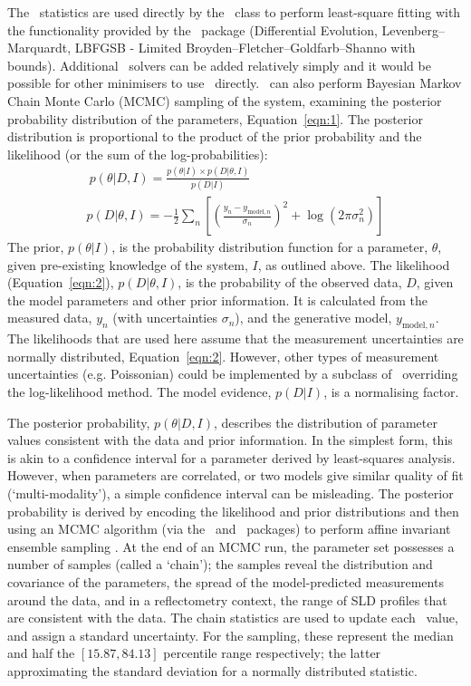 \documentclass[pdf,preprint]{iucr}
\begin{document}
The \Objective\ statistics are used directly by the \CurveFitter\ class to perform least-square fitting with the functionality provided by the \SciPy\ package (Differential  Evolution, Levenberg--Marquardt, LBFGSB - Limited Broyden--Fletcher--Goldfarb--Shanno with bounds). Additional \SciPy\ solvers can be added relatively simply and it would be possible for other minimisers to use \Objective\ directly.
\CurveFitter\ can also perform Bayesian Markov Chain Monte Carlo (MCMC) sampling of the system, examining the posterior probability distribution of the parameters, Equation~\ref{eqn:1}. The posterior distribution is proportional to the product of the prior probability and the likelihood (or the sum of the log-probabilities):
%
\begin{gather} 
\label{eqn:1}\ p(\theta | D, I) = \frac{p(\theta | I)\times p(D | \theta, I)}{p(D | I)}\\
p(D | \theta, I) = -\frac{1}{2} \sum_n \left[\left(\frac{y_n - y_{\mathrm{model},n}} {\sigma_n}\right)^2 + \log(2\pi\sigma_n^2)\right]\label{eqn:2}
\end{gather}
%
The prior, $p(\theta | I)$, is the probability distribution function for a parameter, $\theta$, given pre-existing knowledge of the system, $I$, as outlined above.
The likelihood (Equation~\ref{eqn:2}), $p(D | \theta, I)$, is the probability of the observed data, $D$, given the model parameters and other prior information. It is calculated from the measured data, $y_n$ (with uncertainties $\sigma_n$), and the generative model, $y_{\mathrm{model},n}$. The likelihoods that are used here assume that the measurement uncertainties are normally distributed, Equation~\ref{eqn:2}. However, other types of measurement uncertainties (e.g. Poissonian) could be implemented by a subclass of \Objective\ overriding the log-likelihood method.
The model evidence, $p(D | I)$, is a normalising factor.

The posterior probability, $p(\theta | D, I)$, describes the distribution of parameter values consistent with the data and prior information. In the simplest form, this is akin to a confidence interval for a parameter derived by least-squares analysis. However, when parameters are correlated, or two models give similar quality of fit (`multi-modality'), a simple confidence interval can be misleading.
The posterior probability is derived by encoding the likelihood and prior distributions and then using an MCMC algorithm (via the \emcee\ and \ptemcee\ packages) to perform affine invariant ensemble sampling \cite{emcee, ptemcee}.
At the end of an MCMC run, the parameter set possesses a number of samples (called a `chain'); the samples reveal the distribution and covariance of the parameters, the spread of the model-predicted measurements around the data, and in a reflectometry context, the range of SLD profiles that are consistent with the data.
The chain statistics are used to update each \Parameter\ value, and assign a standard uncertainty. For the sampling, these represent the median and half the $[15.87, 84.13]$ percentile range respectively; the latter approximating the standard deviation for a normally distributed statistic.
\end{document}

